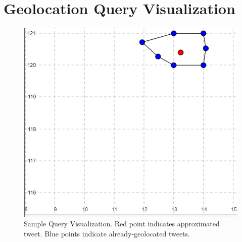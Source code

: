 



\chapter{Geolocation Query Visualization}



\begin{figure}[hbt!]
    \includegraphics[width=\textwidth, height=\textheight,keepaspectratio]{SampleThesisQuery.PNG}
    \caption{Sample Query Visualization. Red point indicates approximated tweet. Blue points indicate already-geolocated tweets.}
\end{figure}

